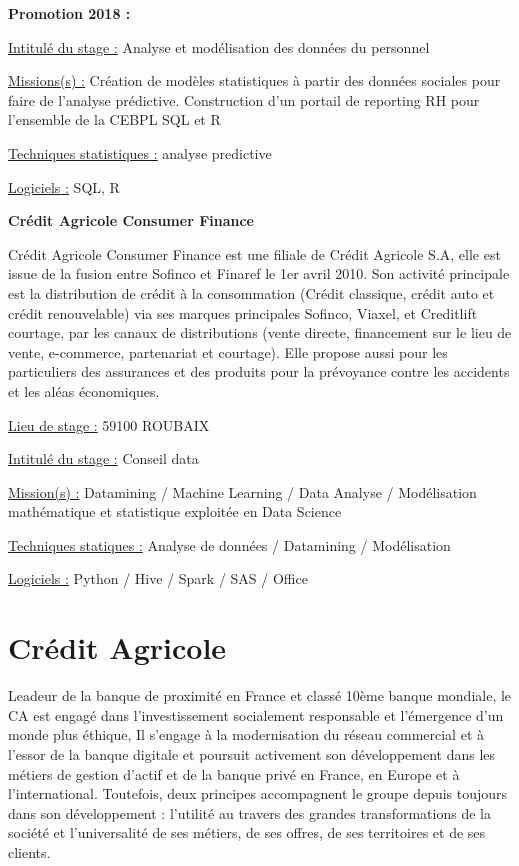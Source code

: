 \documentclass[
  letterpaper,
  DIV=11,
  numbers=noendperiod]{scrreprt}
\begin{document}
\textbf{Promotion 2018 :}

\uline{Intitulé du stage :} Analyse et modélisation des données du
personnel

\uline{Missions(s) :} Création de modèles statistiques à partir des
données sociales pour faire de l'analyse prédictive. Construction d'un
portail de reporting RH pour l'ensemble de la CEBPL SQL et R

\uline{Techniques statistiques :} analyse predictive

\uline{Logiciels :} SQL, R

\textbf{Crédit Agricole Consumer Finance}

Crédit Agricole Consumer Finance est une filiale de Crédit Agricole S.A,
elle est issue de la fusion entre Sofinco et Finaref le 1er avril 2010.
Son activité principale est la distribution de crédit à la consommation
(Crédit classique, crédit auto et crédit renouvelable) via ses marques
principales Sofinco, Viaxel, et Creditlift courtage, par les canaux de
distributions (vente directe, financement sur le lieu de vente,
e-commerce, partenariat et courtage). Elle propose aussi pour les
particuliers des assurances et des produits pour la prévoyance contre
les accidents et les aléas économiques.

\uline{Lieu de stage :} 59100 ROUBAIX

\uline{Intitulé du stage :} Conseil data

\uline{Mission(s) :} Datamining / Machine Learning / Data Analyse /
Modélisation mathématique et statistique exploitée en Data Science

\uline{Techniques statiques :} Analyse de données / Datamining /
Modélisation

\uline{Logiciels :} Python / Hive / Spark / SAS / Office

\hypertarget{cruxe9dit-agricole}{%
\section{\texorpdfstring{\textbf{Crédit
Agricole}}{Crédit Agricole}}\label{cruxe9dit-agricole}}

Leadeur de la banque de proximité en France et classé 10ème banque
mondiale, le CA est engagé dans l'investissement socialement responsable
et l'émergence d'un monde plus éthique, Il s'engage à la modernisation
du réseau commercial et à l'essor de la banque digitale et poursuit
activement son développement dans les métiers de gestion d'actif et de
la banque privé en France, en Europe et à l'international. Toutefois,
deux principes accompagnent le groupe depuis toujours dans son
développement : l'utilité au travers des grandes transformations de la
société et l'universalité de ses métiers, de ses offres, de ses
territoires et de ses clients.
\end{document}
